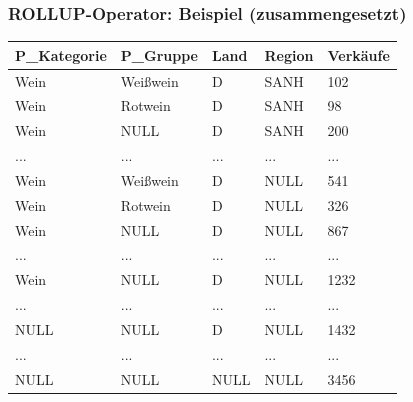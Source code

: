     \begin{frame}[shrink=10]
    
    \frametitle{ROLLUP-Operator: Beispiel (zusammengesetzt)}
    
    \begin{center}
      \begin{tabular}{|l|l|l|l|l|}
        \hline
        \rowcolor{Gray}     P\_Kategorie&	P\_Gruppe&	Land	&Region&	Verkäufe\\
        \hline
        \hline
        Wein	&Weißwein&	D&	SANH&	102\\
        Wein	&Rotwein&	D&	SANH&	98\\
        Wein &	NULL&	D&	SANH&	200\\
        ...	&...&	...&	...&	...\\
        Wein	&Weißwein&	D&	NULL&	541\\
        Wein	&Rotwein&	D	&NULL&	326\\
        Wein&	NULL	&D	&NULL&	867\\
        ...	&...&	...&	...&	...\\
        Wein &NULL& D & NULL& 1232\\
        ...	&...&	...&	...&	...\\
        NULL& NULL& D& NULL& 1432\\
        ...	&...&	...&	...&	...\\
        NULL &NULL& NULL& NULL& 3456\\
        \hline
      \end{tabular}
    \end{center}
    
    
    \end{frame}
    
